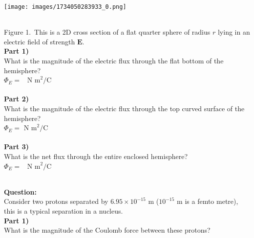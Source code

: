 \documentclass[addpoints,12pt, margin-left=35px]{exam}
\begin{document}
\begin{center}
\texttt{[image: images/1734050283933\_0.png]}
\end{center}\\

Figure 1. This is a 2D cross section of a flat quarter sphere of radius $r$ lying in an electric field of strength $\textbf{E}$.\\

\textbf{Part 1)}\\

What is the magnitude of the electric flux through the flat bottom of the hemisphere?\\

$ \Phi_E = $  \underline{\hspace{3cm}}  $\text{N m}^2 \text{/C}$ \\

\\

\textbf{Part 2)}\\

What is the magnitude of the electric flux through the top curved surface of the hemisphere?\\

$ \Phi_E = $  \underline{\hspace{3cm}}  $\text{N m}^2 \text{/C}$ \\

\\

\textbf{Part 3)}\\

What is the net flux through the entire enclosed hemisphere?\\

$ \Phi_E = $  \underline{\hspace{3cm}}  $\text{N m}^2 \text{/C}$ \\

\\

\newpage

\textbf{Question:}\\

Consider two protons separated by ${6.95} \times 10^{-15} \text{ m}$ ($10^{-15}$ m is a femto metre), this is a typical separation in a nucleus.\\

\textbf{Part 1)}\\

What is the magnitude of the Coulomb force between these protons?\\
\end{document}
